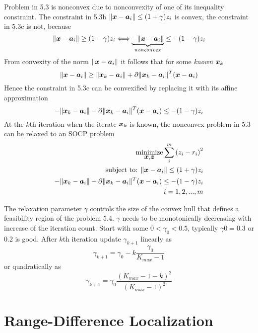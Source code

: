 Problem in 5.3 is nonconvex due to nonconvexity of one of its inequality constraint. The constraint in 5.3b $\|\mbox{\boldmath$x$} - \mbox{\boldmath$a$}_i\| \leq (1+ \gamma)z_i$ is convex, the constraint in 5.3c is not, because
\begin{equation}
\nonumber
\|\mbox{\boldmath$x$} - \mbox{\boldmath$a$}_i\| \geq (1 - \gamma)z_i \Longleftrightarrow \underbrace{-\|\mbox{\boldmath$x$} - \mbox{\boldmath$a$}_i\|}_{nonconvex} \leq -(1 - \gamma)z_i
\end{equation}
From convexity of the norm $\|\mbox{\boldmath$x$} - \mbox{\boldmath$a$}_i\|$ it follows that for some \textit{known} $\mbox{\boldmath$x$}_k$
\begin{equation}
\nonumber
\|\mbox{\boldmath$x$} - \mbox{\boldmath$a$}_i\| \geq \|\mbox{\boldmath$x$}_k - \mbox{\boldmath$a$}_i\| + \partial\|\mbox{\boldmath$x$}_k - \mbox{\boldmath$a$}_i\|^T(\mbox{\boldmath$x$} - \mbox{\boldmath$a$}_i)
\end{equation}
Hence the constraint in 5.3c can be convexified by replacing it with its affine approximation
\begin{equation}
\nonumber
-\|\mbox{\boldmath$x$}_k - \mbox{\boldmath$a$}_i\| - \partial\|\mbox{\boldmath$x$}_k - \mbox{\boldmath$a$}_i\|^T(\mbox{\boldmath$x$} - \mbox{\boldmath$a$}_i) \leq -(1 - \gamma)z_i
\end{equation}
At the $k$th iteration when the iterate $\mbox{\boldmath$x$}_k$ is known, the nonconvex problem in 5.3 can be relaxed to an SOCP problem
\begin{eqnarray} %
\Min_{\Bx, \Bz} \sum^m_i \left( z_i - r_i \right)^2 \\
\setcounter{equation}{4}
\mbox{subject to: } \|\Bx - \Ba_i\| \leq (1+ \gamma)z_i  \\
\setcounter{equation}{4}
-\|\Bx_k - \Ba_i\| - \partial\|\Bx_k - \Ba_i\|^T(\Bx - \Ba_i) \leq -(1 - \gamma)z_i \\
\nonumber
\quad i = 1, 2, ..., m
\end{eqnarray}

The relaxation parameter $\gamma$ controls the size of the convex hull that defines a feasibility region of the problem 5.4.
$\gamma$ needs to be monotonically decreasing with increase of the iteration count. Start with some $0 < \gamma_0 < 0.5$, typically $\gamma0 = 0.3$ or 0.2 is good. After $k$th iteration update $\gamma_{k+1}$ linearly as
\begin{equation}
\nonumber
\gamma_{k+1} = \gamma_0 - k\frac{\gamma_0}{K_{max} - 1}
\end{equation}
or quadratically as
\begin{equation}
\nonumber
\gamma_{k+1} = \gamma_0\frac{(K_{max} - 1 - k)^2}{(K_{max} - 1)^2}
\end{equation}



\section{Range-Difference Localization}

